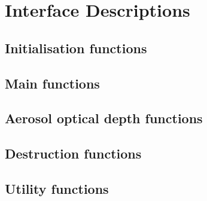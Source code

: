 \chapter{Interface Descriptions}


\section{Initialisation functions}
\newpage


\section{Main functions}
\newpage
\newpage
\newpage
\newpage


\section{Aerosol optical depth functions}
\label{sec:interface-aod}
\newpage
\newpage
\newpage
\newpage


\section{Destruction functions}
\newpage


\section{Utility functions}









